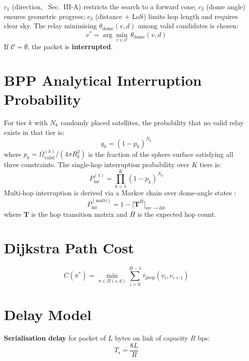\documentclass[12pt,a4paper]{report}
\newcommand{\Pint}{P_{\mathrm{int}}}
\newcommand{\Tprop}{\tau_{\mathrm{prop}}}
\newcommand{\Tser}{T_{\mathrm{s}}}
\begin{document}
$c_1$ (direction, \cite{wang2023reliability}~Sec.~III-A) restricts the search to a
forward cone; $c_2$ (dome angle) ensures geometric progress; $c_3$ (distance + LoS)
limits hop length and requires clear sky. The relay minimising
$\theta_{\mathrm{dome}}(v,d)$ among valid candidates is chosen:
\begin{equation}
  v^* = \arg\min_{v\in\mathcal{C}}\,\theta_{\mathrm{dome}}(v,d)
\end{equation}
If $\mathcal{C}=\emptyset$, the packet is \textbf{interrupted}.

\section{BPP Analytical Interruption Probability}

For tier $k$ with $N_k$ randomly placed satellites, the probability that no valid relay
exists in that tier is:
\begin{equation}
  q_k = (1-p_k)^{N_k}
\end{equation}
where $p_k = \Omega_{\mathrm{valid}}^{(k)}/(4\pi R_k^2)$ is the fraction of the sphere
surface satisfying all three constraints. The single-hop interruption probability over
$K$ tiers is:
\begin{equation}
  \Pint^{(1)} = \prod_{k=1}^{K}(1-p_k)^{N_k}
\end{equation}
Multi-hop interruption is derived via a Markov chain over dome-angle states
\cite{wang2023reliability}:
\begin{equation}
  \Pint^{(\mathrm{multi})} = 1 - \bigl[\mathbf{T}^{\bar H}\bigr]_{\mathrm{src}\to\mathrm{dst}}
\end{equation}
where $\mathbf{T}$ is the hop transition matrix and $\bar H$ is the expected hop count.

\section{Dijkstra Path Cost}

\begin{equation}
  C(\pi^*) = \min_{\pi\in\Pi(s,d)}\sum_{i=0}^{H-1}\Tprop(v_i,v_{i+1})
\end{equation}

\section{Delay Model}

\textbf{Serialisation delay} for packet of $L$ bytes on link of capacity $R$ bps:
\begin{equation}
  \Tser = \frac{8L}{R}
\end{equation}
\end{document}
